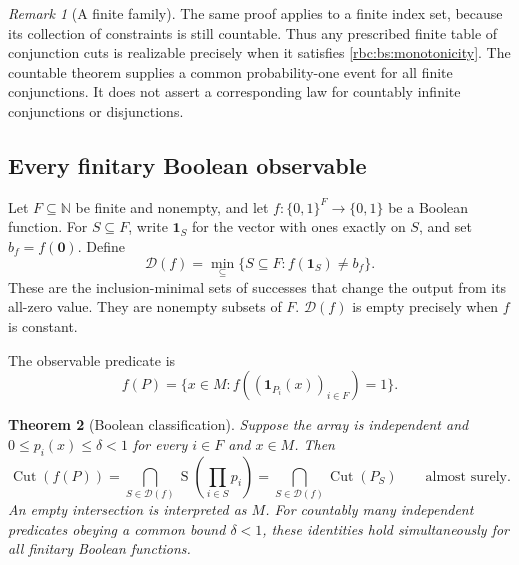 \documentclass[11pt]{article}
\numberwithin{equation}{section}
\newtheorem{theorem}{Theorem}[section]
\theoremstyle{definition}
\theoremstyle{remark}
\newtheorem{remark}[theorem]{Remark}
\newcommand{\N}{\mathbb N}
\newcommand{\Cut}{\operatorname{Cut}}
\newcommand{\SumCut}{\operatorname{S}}
\begin{document}
\begin{remark}[A finite family]
\label{rbc:bs:finite}
The same proof applies to a finite index set, because its collection of
constraints is still countable.  Thus any prescribed finite table of
conjunction cuts is realizable precisely when it satisfies
\eqref{rbc:bs:monotonicity}.  The countable theorem supplies a common
probability-one event for all finite conjunctions.  It does not assert
a corresponding law for countably infinite conjunctions or disjunctions.
\end{remark}

\subsection{Every finitary Boolean observable}

Let $F\subseteq\N$ be finite and nonempty, and let
$f:\{0,1\}^{F}\to\{0,1\}$ be a Boolean function.  For $S\subseteq F$,
write $\mathbf1_S$ for the vector with ones exactly on $S$, and set
$b_f=f(\mathbf0)$.  Define
\begin{equation}
\label{rbc:bs:sensitive}
  \mathcal D(f)=\min_{\subseteq}
   \{S\subseteq F:f(\mathbf1_S)\ne b_f\}.
\end{equation}
These are the inclusion-minimal sets of successes that change the output
from its all-zero value.  They are nonempty subsets of $F$.
$\mathcal D(f)$ is empty precisely when $f$ is constant.

The observable predicate is
\[
  f(P)=\{x\in M:
          f((\mathbf1_{P_i}(x))_{i\in F})=1\}.
\]

\begin{theorem}[Boolean classification]
\label{rbc:bs:boolean}
Suppose the array is independent and
$0\leq p_i(x)\leq\delta<1$ for every $i\in F$ and $x\in M$.
Then
\begin{equation}
\label{rbc:bs:boolean-law}
  \Cut(f(P))
   =\bigcap_{S\in\mathcal D(f)}\SumCut
       \left(\prod_{i\in S}p_i\right)
   =\bigcap_{S\in\mathcal D(f)}\Cut(P_S)
   \qquad\text{almost surely}.
\end{equation}
An empty intersection is interpreted as $M$.  For countably many
independent predicates obeying a common bound $\delta<1$, these identities
hold simultaneously for all finitary Boolean functions.
\end{theorem}
\end{document}
